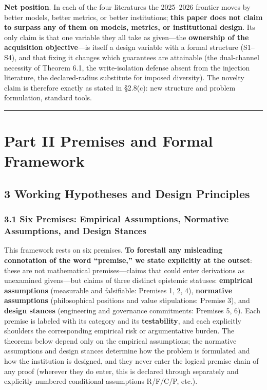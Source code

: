 \documentclass[
  11pt]{article}
\begin{document}
\textbf{Net position}. In each of the four literatures the 2025--2026
frontier moves by better models, better metrics, or better institutions;
\textbf{this paper does not claim to surpass any of them on models,
metrics, or institutional design}. Its only claim is that one variable
they all take as given---the \textbf{ownership of the acquisition
objective}---is itself a design variable with a formal structure
(S1--S4), and that fixing it changes which guarantees are attainable
(the dual-channel necessity of Theorem 6.1, the write-isolation defense
absent from the injection literature, the declared-radius substitute for
imposed diversity). The novelty claim is therefore exactly as stated in
§2.8(c): new structure and problem formulation, standard tools.

\begin{center}\rule{0.5\linewidth}{0.5pt}\end{center}

\section{Part II Premises and Formal
Framework}\label{part-ii-premises-and-formal-framework}

\subsection{3 Working Hypotheses and Design
Principles}\label{working-hypotheses-and-design-principles}

\subsubsection{3.1 Six Premises: Empirical Assumptions, Normative
Assumptions, and Design
Stances}\label{six-premises-empirical-assumptions-normative-assumptions-and-design-stances}

This framework rests on six premises. \textbf{To forestall any
misleading connotation of the word ``premise,'' we state explicitly at
the outset}: these are not mathematical premises---claims that could
enter derivations as unexamined givens---but claims of three distinct
epistemic statuses: \textbf{empirical assumptions} (measurable and
falsifiable: Premises 1, 2, 4), \textbf{normative assumptions}
(philosophical positions and value stipulations: Premise 3), and
\textbf{design stances} (engineering and governance commitments:
Premises 5, 6). Each premise is labeled with its category and its
\textbf{testability}, and each explicitly shoulders the corresponding
empirical risk or argumentative burden. The theorems below depend only
on the empirical assumptions; the normative assumptions and design
stances determine how the problem is formulated and how the institution
is designed, and they never enter the logical premise chain of any proof
(wherever they do enter, this is declared through separately and
explicitly numbered conditional assumptions R/F/C/P, etc.).
\end{document}
